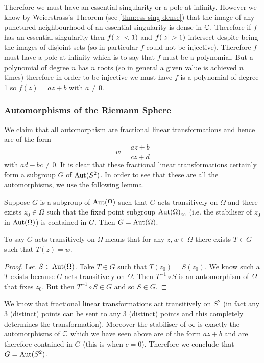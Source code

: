 Therefore we must have an essential singularity or a pole at infinity. However we know by Weierstrass's Theorem (see \autoref{thm:ess-sing-dense}) that the image of any punctured neighbourhood of an essential singularity is dense in $\mathbb{C}$. Therefore if $f$ has an essential singularity then $f(\left|z\right| < 1)$ and $f(\left|z\right| > 1)$ intersect despite being the images of disjoint sets (so in particular $f$ could not be injective). Therefore $f$ must have a pole at infinity which is to say that $f$ must be a polynomial. But a polynomial of degree $n$ has $n$ roots (so in general a given value is achieved $n$ times) therefore in order to be injective we must have $f$ is a polynomial of degree 1 so $f(z) = az + b$ with $a \neq 0$.

\subsubsection{Automorphisms of the Riemann Sphere}
We claim that all automorphism are fractional linear transformations and hence are of the form
$$w = \frac{az + b}{cz + d}$$
with $ad - bc \neq 0$. It is clear that these fractional linear transformations certainly form a subgroup $G$ of $\text{Aut}(S^2)$. In order to see that these are all the automorphisms, we use the following lemma.

\begin{lemma}
    Suppose $G$ is a subgroup of $\text{Aut}(\Omega)$ such that $G$ acts transitively on $\Omega$ and there exists $z_0 \in \Omega$ such that the fixed point subgroup $\text{Aut}(\Omega)_{z_0}$ (i.e. the stabiliser of $z_0$ in $\text{Aut}(\Omega)$) is contained in $G$. Then $G = \text{Aut}(\Omega)$. 
\end{lemma}
\begin{remark}
    To say $G$ acts transitively on $\Omega$ means that for any $z, w \in \Omega$ there exists $T \in G$ such that $T(z) = w$. 
\end{remark}
\begin{proof}
    Let $S \in \text{Aut}(\Omega)$. Take $T \in G$ such that $T(z_0) = S(z_0)$. We know such a $T$ exists because $G$ acts transitively on $\Omega$. Then $T^{-1} \circ S$ is an automorphism of $\Omega$ that fixes $z_0$. But then $T^{-1} \circ S \in G$ and so $S \in G$.
\end{proof}
We know that fractional linear transformations act transitively on $S^2$ (in fact any 3 (distinct) points can be sent to any 3 (distinct) points and this completely determines the transformation). Moreover the stabiliser of $\infty$ is exactly the automorphisms of $\mathbb{C}$ which we have seen above are of the form $az + b$ and are therefore contained in $G$ (this is when $c = 0$). Therefore we conclude that $G = \text{Aut}(S^2)$.

